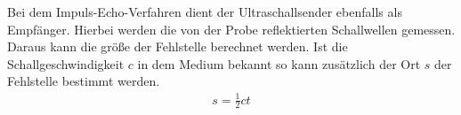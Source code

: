 Bei dem Impuls-Echo-Verfahren dient der Ultraschallsender ebenfalls als Empfänger. Hierbei werden die von der Probe reflektierten
Schallwellen gemessen. Daraus kann die größe der Fehlstelle berechnet werden. Ist die Schallgeschwindigkeit $c$ in dem Medium bekannt
so kann zusätzlich der Ort $s$ der Fehlstelle bestimmt werden.
\begin{align}
  s = \frac{1}{2}ct
\end{align}
